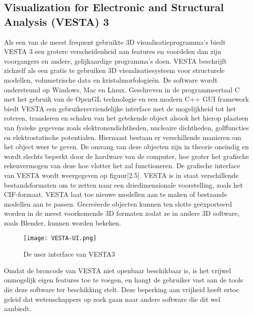 \subsection{Visualization for Electronic and Structural Analysis (VESTA) 3}
Als een van de meest frequent gebruikte 3D visualisatieprogramma’s biedt VESTA 3 een grotere verscheidenheid aan features en voordelen dan zijn voorgangers en andere, gelijkaardige programma’s doen. VESTA beschrijft zichzelf als een gratis te gebruiken 3D visualisatiesysteem voor structurele modellen, volumetrische data en kristalmorfologieën. \citep*{VESTA1} De software wordt ondersteund op Windows, Mac en Linux. Geschreven in de programmeertaal C met het gebruik van de OpenGL technologie en een modern C++ GUI framework biedt VESTA een gebruikersvriendelijke interface met de mogelijkheid tot het roteren, transleren en schalen van het getekende object alsook het hierop plaatsen van fysieke gegevens zoals elektronendichtheden, nucleaire dichtheden, golffuncties en elektrostatische potentialen. Hiernaast bestaan er verschillende manieren om het object weer te geven. De omvang van deze objecten zijn in theorie oneindig en wordt slechts beperkt door de hardware van de computer, hoe groter het grafische rekenvermogen van deze hoe vlotter het zal functioneren. De grafische interface van VESTA wordt weergegeven op figuur[2.5]. VESTA is in staat verschillende bestandsformaten om te zetten naar een driedimensionale voorstelling, zoals het CIF-formaat. VESTA laat toe nieuwe modellen aan te maken of bestaande modellen aan te passen. Gecreëerde objecten kunnen ten slotte geëxporteerd worden in de meest voorkomende 3D formaten zodat ze in andere 3D software, zoals Blender, kunnen worden bekeken.
\\
\begin{figure}[H]
\texttt{[image: VESTA-UI.png]}
\caption{De user interface van VESTA3}
\end{figure}

\par
 Omdat de broncode van VESTA niet openbaar beschikbaar is, is het vrijwel onmogelijk eigen features toe te voegen, en hangt de gebruiker vast aan de tools die deze software ter beschikking stelt. Deze beperking aan vrijheid heeft ertoe geleid dat wetenschappers op zoek gaan naar andere software die dit wel aanbiedt.

